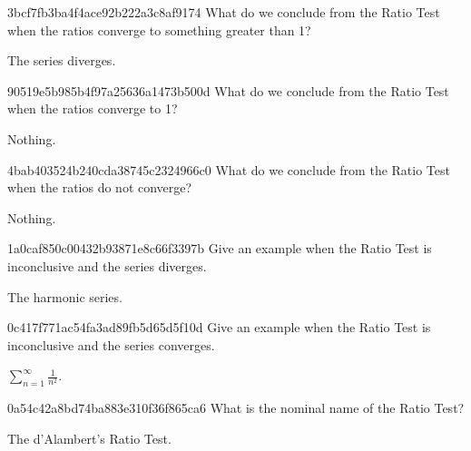 \begin{note}{3bcf7fb3ba4f4ace92b222a3c8af9174}
    What do we conclude from the Ratio Test when the ratios converge to something greater than 1?

    \begin{cloze}{1}
        The series diverges.
    \end{cloze}
\end{note}

\begin{note}{90519e5b985b4f97a25636a1473b500d}
    What do we conclude from the Ratio Test when the ratios converge to 1?

    \begin{cloze}{1}
        Nothing.
    \end{cloze}
\end{note}

\begin{note}{4bab403524b240cda38745c2324966c0}
    What do we conclude from the Ratio Test when the ratios do not converge?

    \begin{cloze}{1}
        Nothing.
    \end{cloze}
\end{note}

\begin{note}{1a0caf850c00432b93871e8c66f3397b}
    Give an example when the Ratio Test is inconclusive and the series diverges.

    \begin{cloze}{1}
        The harmonic series.
    \end{cloze}
\end{note}

\begin{note}{0c417f771ac54fa3ad89fb5d65d5f10d}
    Give an example when the Ratio Test is inconclusive and the series converges.

    \begin{cloze}{1}
        \({ \sum_{n=1}^{\infty} \frac{1}{n^2} }\).
    \end{cloze}
\end{note}

\begin{note}{0a54c42a8bd74ba883e310f36f865ca6}
    What is the nominal name of the Ratio Test?

    \begin{cloze}{1}
        The d'Alambert's Ratio Test.
    \end{cloze}
\end{note}

